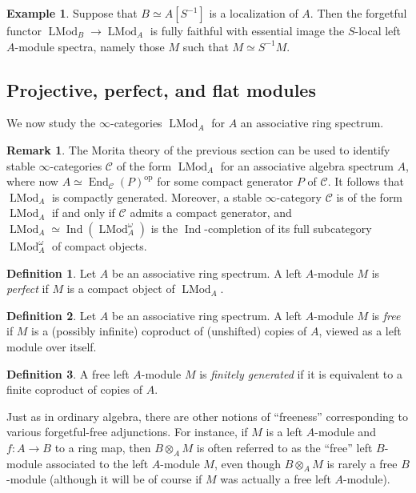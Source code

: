 \documentclass[12pt]{article}
\theoremstyle{definition}
\newtheorem{definition}{Definition}[subsection]
\newtheorem{example}{Example}[subsection]
\newtheorem{remark}{Remark}[subsection]
\newcommand{\C}{\mathcal{C}}
\renewcommand{\i}{\infty}
\newcommand{\op}{\mathrm{op}}
\DeclareMathOperator{\LMod}{LMod}
\DeclareMathOperator{\End}{End}
\DeclareMathOperator{\Ind}{Ind}
\begin{document}
\begin{example}
Suppose that $B\simeq A[S^{-1}]$ is a localization of $A$.
Then the forgetful functor $\LMod_B\to\LMod_A$ is fully faithful with essential image the $S$-local left $A$-module spectra, namely those $M$ such that $M\simeq S^{-1}M$.
\end{example}



\subsection{Projective, perfect, and flat modules}

We now  study the $\infty$-categories $\LMod_A$ for $A$ an associative ring spectrum.

\begin{remark}
The Morita theory of the previous section can be used to identify stable $\i$-categories $\C$ of the form $\LMod_A$ for an associative algebra spectrum $A$, where now $A\simeq\End_\C(P)^{\op}$ for some compact generator $P$ of $\C$.
It follows that $\LMod_A$ is compactly generated.
Moreover, a stable $\infty$-category $\C$ is of the form $\LMod_A$ if and only if $\C$ admits a compact generator, and $\LMod_A\simeq\Ind(\LMod_A^\omega)$ is the $\Ind$-completion of its full subcategory $\LMod_A^\omega$ of compact objects.
\end{remark}
\begin{definition}
Let $A$ be an associative ring spectrum.
A left $A$-module $M$ is {\em perfect} if $M$ is a compact object of $\LMod_A$.
\end{definition}

\begin{definition}\label{def:freemod}
Let $A$ be an associative ring spectrum.
A left $A$-module $M$ is {\em free} if $M$ is a (possibly infinite) coproduct of (unshifted) copies of $A$, viewed as a left module over itself.
\end{definition}

\begin{definition}
A free left $A$-module $M$ is {\em finitely generated} if it is equivalent to a finite coproduct of copies of $A$.
\end{definition}

Just as in ordinary algebra, there are other notions of ``freeness'' corresponding to various forgetful-free adjunctions.
For instance, if $M$ is a left $A$-module and $f:A\to B$ to a ring map, then $B\otimes_A M$ is often referred to as the ``free'' left $B$-module associated to the left $A$-module $M$, even though $B\otimes_A M$ is rarely a free $B$-module (although it will be of course if $M$ was actually a free left $A$-module).
\end{document}
